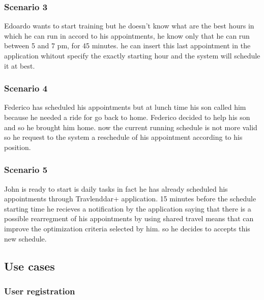 \subsubsection{Scenario 3} \label{scenario:3}
Edoardo wants to start training but he doesn't know what are the best hours in which he can run in accord to his appointments, he know only that he can run between 5 and 7 pm, for 45 minutes. he can insert this last appointment in the application whitout specify the exactly starting hour and the system will schedule it at best.

\subsubsection{Scenario 4} \label{scenario:4}
Federico has scheduled his appointments but at lunch time his son called him because he needed a ride for go back to home. Federico decided to help his son and so he brought him home. now the current running schedule is not more valid so he request to the system a reschedule of his appointment according to his position.  


\subsubsection{Scenario 5} \label{scenario:5}
John is ready to start is daily tasks in fact he has already scheduled his appointments through Travlenddar+ application. 15 minutes before the schedule starting time he recieves a notification by the application saying that there is a possible rearregment of his appointments by using shared travel means that can improve the optimization criteria selected by him. so he decides to accepts this new schedule.

\subsection{Use cases}

\subsubsection{User registration} \label{usecase:User registration}

